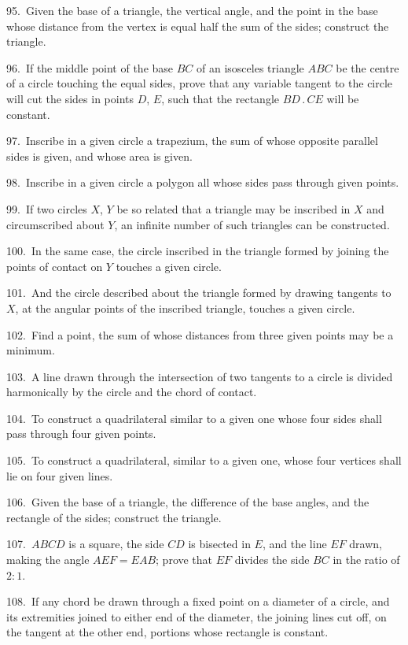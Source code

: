 \documentclass[oneside]{book}
\begin{document}
\begin{footnotesize}
95.~Given the base of a triangle, the vertical angle, and the
point in the base whose distance from the vertex is equal half
the sum of the sides; construct the triangle.

96.~If the middle point of the base $BC$ of an isosceles triangle
$ABC$ be the centre of a circle touching the equal sides, prove that
any variable tangent to the circle will cut the sides in points
$D$, $E$, such that the rectangle $BD\,.\,CE$ will be constant.

97.~Inscribe in a given circle a trapezium, the sum of whose
opposite parallel sides is given, and whose area is given.

98.~Inscribe in a given circle a polygon all whose sides pass
through given points.

99.~If two circles $X$, $Y$ be so related that a triangle may be
inscribed in $X$ and circumscribed about $Y$, an infinite number of
such triangles can be constructed.

100.~In the same case, the circle inscribed in the triangle
formed by joining the points of contact on $Y$ touches a given
circle.

101.~And the circle described about the triangle formed by
drawing tangents to $X$, at the angular points of the inscribed triangle,
touches a given circle.

102.~Find a point, the sum of whose distances from three
given points may be a minimum.

103.~A line drawn through the intersection of two tangents to
a circle is divided harmonically by the circle and the chord of
contact.

104.~To construct a quadrilateral similar to a given one whose
four sides shall pass through four given points.

105.~To construct a quadrilateral, similar to a given one,
whose four vertices shall lie on four given lines.

106.~Given the base of a triangle, the difference of the base
angles, and the rectangle of the sides; construct the triangle.

107.~$ABCD$ is a square, the side $CD$ is bisected in $E$, and the
line $EF$ drawn, making the angle $AEF = EAB$; prove that $EF$
divides the side $BC$ in the ratio of $2 : 1$.

108.~If any chord be drawn through a fixed point on a diameter
of a circle, and its extremities joined to either end of the
diameter, the joining lines cut off, on the tangent at the other
end, portions whose rectangle is constant.


\end{footnotesize}
\end{document}

